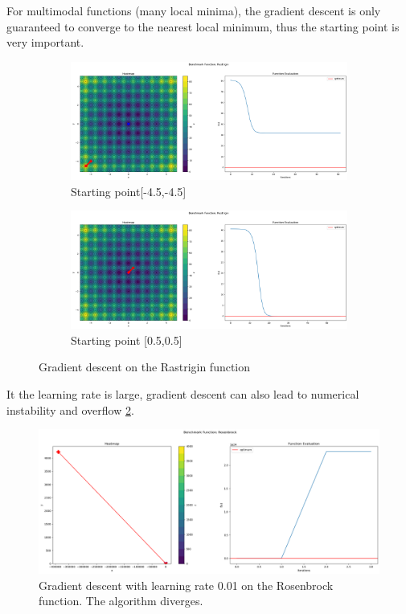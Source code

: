 For multimodal functions (many local minima), the gradient descent is only guaranteed to converge to the nearest local minimum, thus the starting point is very important.
\begin{figure}[H]
    \begin{subfigure}{0.5\linewidth}
        \includegraphics[width=\linewidth]{lab3/imgs/gd_rastr_local.png}
        \caption{Starting point[-4.5,-4.5]}
    \end{subfigure}
    \begin{subfigure}{0.5\linewidth}
        \includegraphics[width=\linewidth]{lab3/imgs/gd_rastr_global.png}
        \caption{Starting point [0.5,0.5]}
    \end{subfigure}
    \caption{Gradient descent on the Rastrigin function}
    \label{fig:gd-rastr}
\end{figure}

It the learning rate is large, gradient descent can also lead to numerical instability and overflow \ref{fig:ros-div}.
\begin{figure}[H]
    \includegraphics[width=\linewidth]{lab3/imgs/gd_rosenbrock_divergence.png}
    \caption{Gradient descent with learning rate 0.01 on the Rosenbrock function. The algorithm diverges.}
    \label{fig:ros-div}
\end{figure}



